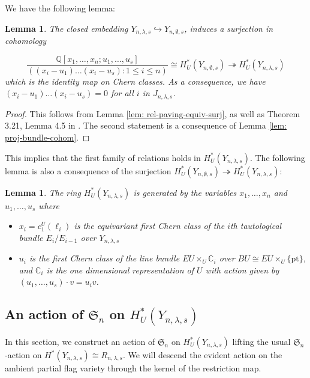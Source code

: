 \documentclass[11pt]{amsart}
\numberwithin{equation}{section}
\newtheorem{lemma}[theorem]{Lemma}
\theoremstyle{definition}
\newcommand{\symm}{{\mathfrak{S}}}
\newcommand{\CC}{{\mathbb{C}}}
\newcommand{\QQ}{{\mathbb{Q}}}
\begin{document}
We have the following lemma:
\begin{lemma}\label{lem: proj-bundle-surjection}
    The closed embedding $Y_{n,\lambda,s} \hookrightarrow Y_{n,\emptyset,s}$, induces a surjection in cohomology

    \[
\frac{\QQ[x_1,\dots,x_n;u_1,\dots,u_s]}{( (x_i-u_1)\dots(x_i-u_s) : 1 \leq i \leq n)} \cong H^*_U(Y_{n,\emptyset,s}) \twoheadrightarrow H^*_U(Y_{n,\lambda,s})
\]
    which is the identity map on Chern classes. As a consequence, we have $(x_i-u_1)\dots(x_i-u_s) = 0$ for all $i$ in $J_{n,\lambda,s}$.
\end{lemma}

\begin{proof}
    This follows from Lemma \ref{lem: rel-paving-equiv-surj}, as well as Theorem 3.21, Lemma 4.5 in \cite{GLW}. The second statement is a consequence of Lemma \ref{lem: proj-bundle-cohom}.
\end{proof}

This implies that the first family of relations holds in $H^*_U(Y_{n,\lambda,s})$. The following lemma is also a consequence of the surjection $H^*_U(Y_{n,\emptyset,s}) \twoheadrightarrow H^*_U(Y_{n,\lambda,s})$:
\begin{lemma}\label{lem: vars-generate}
    The ring $H^*_U(Y_{n,\lambda,s})$ is generated by the variables $x_1,\dots,x_n$ and $u_1,\dots,u_s$ where
    \begin{itemize}
        \item $x_i = c_1^U(\ell_i)$ is the equivariant first Chern class of the $i$th tautological bundle $E_i/E_{i-1}$ over $Y_{n,\lambda,s}$
        \item $u_i$ is the first Chern class of the line bundle $EU \times_U \CC_i$ over $BU \cong EU \times_U \{\text{pt}\}$, and $\CC_i$ is the one dimensional representation of $U$ with action given by $(u_1,\dots,u_s)\cdot v = u_iv$.
    \end{itemize}
\end{lemma}

\subsection{An action of $\symm_n$ on $H^*_U(Y_{n,\lambda,s})$}

In this section, we construct an action of $\symm_n$ on
$H^*_U(Y_{n,\lambda,s})$ lifting the usual $\symm_n$-action on
$H^*(Y_{n,\lambda,s})\cong R_{n,\lambda,s}$. We will descend the evident action on the ambient
partial flag variety through the kernel of the restriction map.
\end{document}
